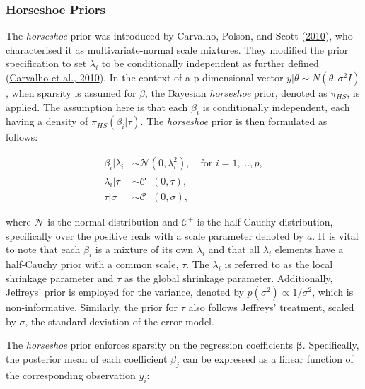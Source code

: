 \documentclass[
  11pt,
]{article}
\begin{document}
\subsubsection{Horseshoe Priors}

The \emph{horseshoe} prior was introduced by Carvalho, Polson, and Scott
(\protect\hyperlink{ref-Carvalho2010}{2010}), who characterised it as
multivariate-normal scale mixtures. They modified the prior
specification to set \(\lambda_i\) to be conditionally independent as
further defined (\protect\hyperlink{ref-Carvalho2010}{Carvalho et al.,
2010}). In the context of a p-dimensional vector
\(y|\theta \sim N(\theta, \sigma^2I)\), when sparsity is assumed for
\(\beta\), the Bayesian \emph{horseshoe} prior, denoted as \(\pi_{HS}\),
is applied. The assumption here is that each \(\beta_i\) is
conditionally independent, each having a density of
\(\pi_{HS} (\beta_i | \tau)\). The \emph{horseshoe} prior is then
formulated as follows:

\begin{equation}
\begin{aligned}
\beta_i | \lambda_i &\sim \mathcal{N}(0, \lambda_i^2), \quad \text{for } i = 1,\ldots,p, \\
\lambda_i | \tau &\sim \mathcal{C}^+(0, \tau), \\
\tau | \sigma &\sim \mathcal{C}^+(0, \sigma), 
\end{aligned}
\end{equation}

where \(\mathcal{N}\) is the normal distribution and \(\mathcal{C}^+\)
is the half-Cauchy distribution, specifically over the positive reals
with a scale parameter denoted by \(a\). It is vital to note that each
\(\beta_i\) is a mixture of its own \(\lambda_i\) and that all
\(\lambda_i\) elements have a half-Cauchy prior with a common scale,
\(\tau\). The \(\lambda_i\) is referred to as the local shrinkage
parameter and \(\tau\) as the global shrinkage parameter. Additionally,
Jeffreys' prior is employed for the variance, denoted by
\(p(\sigma^2) \propto 1/\sigma^2\), which is non-informative. Similarly,
the prior for \(\tau\) also follows Jeffreys' treatment, scaled by
\(\sigma\), the standard deviation of the error model.

The \emph{horseshoe} prior enforces sparsity on the regression
coefficients \(\boldsymbol{\beta}\). Specifically, the posterior mean of
each coefficient \(\beta_j\) can be expressed as a linear function of
the corresponding observation \(y_i\):
\end{document}
